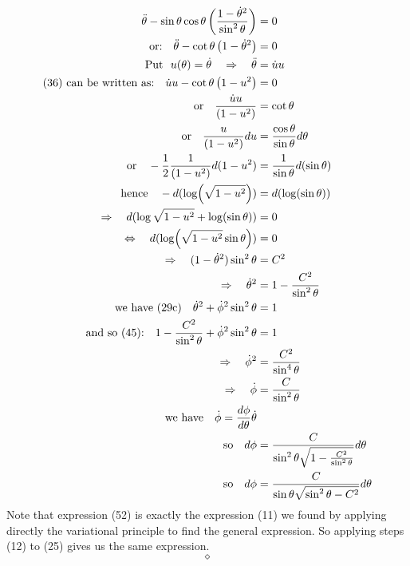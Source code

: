 \begin{align}
\ddot{\theta} - \sin\theta\cos\theta\left(\frac{1 - \dot{\theta}^2}{\sin^2\theta}\right)&= 0\\
\text{or:}\quad \ddot{\theta} - \cot\theta\left( 1-\dot{\theta}^2\right) &= 0\\
\text{Put }\ u(\theta)= \dot{\theta}\quad\Rightarrow\quad \ddot{\theta} &= \dot{u}u\\
\text{(36) can be written as:}\quad \dot{u}u - \cot\theta\left( 1-u^2\right) &= 0\\
\text{or}\quad \frac{\dot{u}u}{\left( 1-u^2\right)} &= \cot\theta\\
\text{or}\quad \frac{u}{\left( 1-u^2\right)}du &= \frac{\cos\theta}{\sin\theta} d\theta\\
\text{or}\quad -\frac{1}{2}\frac{1}{\left( 1-u^2\right)}d(1-u^2) &= \frac{1}{\sin \theta} d(\sin\theta)\\
\text{hence}\quad -d(\log (\sqrt{1-u^2})) &= d(\log(\sin\theta))\\
\Rightarrow \quad d(\log \sqrt{1-u^2} +\log(\sin\theta))&=0\\
\Leftrightarrow \quad d(\log( \sqrt{1-u^2}\sin\theta))&=0\\
\Rightarrow \quad (1-\dot{\theta}^2)\sin^2\theta &= C^2\\
\Rightarrow \quad \dot{\theta}^2&= 1-\frac{C^2}{\sin^2\theta}\\
\text{we have (29c)}\quad \dot{\theta}^2+\dot{\phi}^2\sin^2\theta &= 1\\
\text{and so (45):}\quad 1-\frac{C^2}{\sin^2\theta}+\dot{\phi}^2\sin^2\theta &= 1\\
\Rightarrow \quad \dot{\phi}^2 &= \frac{C^2}{\sin^4\theta}\\
\Rightarrow \quad \dot{\phi} &= \frac{C}{\sin^2\theta}\\
\text{we have} \quad \dot{\phi}=\dv{\phi}{\theta}\dot{\theta}\\
\text{so} \quad d\phi  &= \frac{C}{\sin^2\theta\sqrt{1-\frac{C^2}{\sin^2\theta}}}d\theta\\
\text{so} \quad d\phi  &= \frac{C}{\sin\theta\sqrt{\sin^2\theta-C^2}}d\theta
\end{align}
Note that expression (52) is exactly the expression (11) we found by applying directly the variational principle to find the general expression. So applying steps (12) to (25) gives us the same expression.
$$\diamond$$
\newpage
